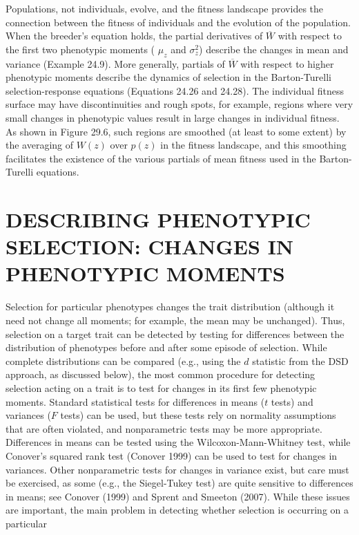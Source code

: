 \documentclass{article}
\begin{document}
Populations, not individuals, evolve, and the fitness landscape provides the connection between the fitness of individuals and the evolution of the population. When the breeder's equation holds, the partial derivatives of  $ \overline{W} $ with respect to the first two phenotypic moments ( $ \mu_{z} $ and  $ \sigma_{z}^{2} $) describe the changes in mean and variance (Example 24.9). More generally, partials of  $ \overline{W} $ with respect to higher phenotypic moments describe the dynamics of selection in the Barton-Turelli selection-response equations (Equations 24.26 and 24.28). The individual fitness surface may have discontinuities and rough spots, for example, regions where very small changes in phenotypic values result in large changes in individual fitness. As shown in Figure 29.6, such regions are smoothed (at least to some extent) by the averaging of  $ W(z) $ over  $ p(z) $ in the fitness landscape, and this smoothing facilitates the existence of the various partials of mean fitness used in the Barton-Turelli equations.

\section{DESCRIBING PHENOTYPIC SELECTION: CHANGES IN PHENOTYPIC MOMENTS}
Selection for particular phenotypes changes the trait distribution (although it need not change all moments; for example, the mean may be unchanged). Thus, selection on a target trait can be detected by testing for differences between the distribution of phenotypes before and after some episode of selection. While complete distributions can be compared (e.g., using the $d$ statistic from the DSD approach, as discussed below), the most common procedure for detecting selection acting on a trait is to test for changes in its first few phenotypic moments. Standard statistical tests for differences in means ($t$ tests) and variances ($F$ tests) can be used, but these tests rely on normality assumptions that are often violated, and nonparametric tests may be more appropriate. Differences in means can be tested using the Wilcoxon-Mann-Whitney test, while Conover's squared rank test (Conover 1999) can be used to test for changes in variances. Other nonparametric tests for changes in variance exist, but care must be exercised, as some (e.g., the Siegel-Tukey test) are quite sensitive to differences in means; see Conover (1999) and Sprent and Smeeton (2007). While these issues are important, the main problem in detecting whether selection is occurring on a particular
\end{document}
